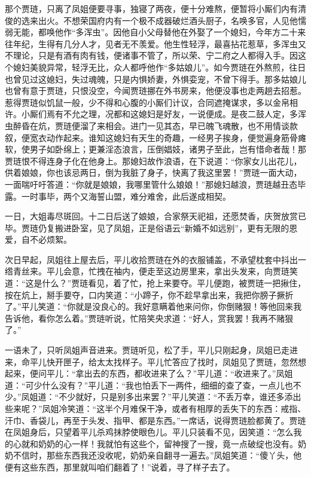 \documentclass[12pt,oneside]{book}
\begin{document}
那个贾琏，只离了凤姐便要寻事，独寝了两夜，便十分难熬，便暂将小厮们内有清俊的选来出火。不想荣国府内有一个极不成器破烂酒头厨子，名唤多官，人见他懦弱无能，都唤他作“多浑虫”。因他自小父母替他在外娶了一个媳妇，今年方二十来往年纪，生得有几分人才，见者无不羡爱。他生性轻浮，最喜拈花惹草，多浑虫又不理论，只是有酒有肉有钱，便诸事不管了，所以荣、宁二府之人都得入手。因这个媳妇美貌异常，轻浮无比，众人都呼他作“多姑娘儿”。如今贾琏在外熬煎，往日也曾见过这媳妇，失过魂魄，只是内惧娇妻，外惧娈宠，不曾下得手。那多姑娘儿也曾有意于贾琏，只恨没空，今闻贾琏挪在外书房来，他便没事也走两趟去招惹。惹得贾琏似饥鼠一般，少不得和心腹的小厮们计议，合同遮掩谋求，多以金帛相许。小厮们焉有不允之理，况都和这媳妇是好友，一说便成。是夜二鼓人定，多浑虫醉昏在炕，贾琏便溜了来相会。进门一见其态，早已魄飞魂散，也不用情谈款叙，便宽衣动作起来。谁知这媳妇有天生的奇趣，一经男子挨身，便觉遍身筋骨瘫软，使男子如卧绵上；更兼淫态浪言，压倒娼妓，诸男子至此，岂有惜命者哉！那贾琏恨不得连身子化在他身上。那媳妇故作浪语，在下说道：“你家女儿出花儿，供着娘娘，你也该忌两日，倒为我脏了身子，快离了我这里罢！”贾琏一面大动，一面喘吁吁答道：“你就是娘娘，我哪里管什么娘娘！”那媳妇越浪，贾琏越丑态毕露。一时事毕，两个又海誓山盟，难分难舍，此后遂成相契。

一日，大姐毒尽斑回。十二日后送了娘娘，合家祭天祀祖，还愿焚香，庆贺放赏已毕。贾琏仍复搬进卧室，见了凤姐，正是俗语云“新婚不如远别”，更有无限的恩爱，自不必烦絮。

次日早起，凤姐往上屋去后，平儿收拾贾琏在外的衣服铺盖，不承望枕套中抖出一绺青丝来。平儿会意，忙拽在袖内，便走至这边房里来，拿出头发来，向贾琏笑道：“这是什么？”贾琏看见，着了忙，抢上来要夺。平儿便跑，被贾琏一把揪住，按在炕上，掰手要夺，口内笑道：“小蹄子，你不趁早拿出来，我把你膀子撅折了。”平儿笑道：“你就是没良心的。我好意瞒着他来问你，你倒赌狠！等他回来我告诉他，看你怎么着。”贾琏听说，忙陪笑央求道：“好人，赏我罢！我再不赌狠了。”

一语未了，只听凤姐声音进来。贾琏听见，松了手，平儿只刚起身，凤姐已走进来，命平儿快开匣子，给太太找样子。平儿忙答应了找时，凤姐见了贾琏，忽然想起来，便问平儿：“拿出去的东西，都收进来了么？”平儿道：“收进来了。”凤姐道：“可少什么没有？”平儿道：“我也怕丢下一两件，细细的查了查，一点儿也不少。”凤姐道：“不少就好，只是别多出来罢？”平儿笑道：“不丢万幸，谁还多添出些来呢？”凤姐冷笑道：“这半个月难保干净，或者有相厚的丢失下的东西：戒指、汗巾、香袋儿，再至于头发、指甲、都是东西。”一席话，说得贾琏脸都黄了。贾琏在凤姐身后，只望着平儿杀鸡抹脖使眼色儿。平儿只装看不见，因笑道：“怎么我的心就和奶奶的心一样！我就怕有这些个，留神搜了一搜，竟一点破绽也没有。奶奶不信时，那些东西我还没收呢，奶奶亲自翻寻一遍去。”凤姐笑道：“傻丫头，他便有这些东西，那里就叫咱们翻着了！”说着，寻了样子去了。
\end{document}
